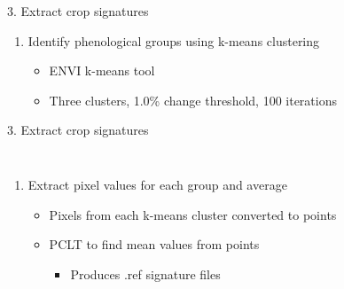 \documentclass[  compress,xcolor={usenames,dvipsnames}]{beamer}
\begin{document}
\begin{frame}{3. Extract crop signatures}
\begin{enumerate}
  \item[3.3] Identify phenological groups using k-means clustering
  \begin{itemize}
    \item<1-> ENVI k-means tool
    \item<2-> Three clusters, 1.0\% change threshold, 100 iterations
  \end{itemize}
\end{enumerate}
\end{frame}

\begin{frame}{3. Extract crop signatures}
\begin{columns}
  \begin{minipage}{1.4\textwidth}
  \begin{enumerate}
    \item[3.3] Extract pixel values for each group and average
    \begin{itemize}
      \item<1-> Pixels from each k-means cluster converted to points
      \item<2-> PCLT to find mean values from points
      \begin{itemize}
        \item<2-> Produces .ref signature files
      \end{itemize}
    \end{itemize}
  \end{enumerate}
  \end{minipage}
  \begin{figure}
    \raggedleft
    \resizebox{\textwidth}{!}{}
  \end{figure}
\end{columns}
\end{frame}
\end{document}
